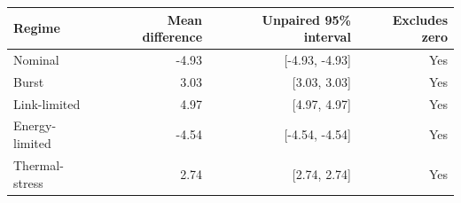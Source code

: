\begin{tabular}{lrrr}
\toprule
Regime & Mean difference & Unpaired 95\% interval & Excludes zero \\
\midrule
Nominal & -4.93 & [-4.93, -4.93] & Yes \\
Burst & 3.03 & [3.03, 3.03] & Yes \\
Link-limited & 4.97 & [4.97, 4.97] & Yes \\
Energy-limited & -4.54 & [-4.54, -4.54] & Yes \\
Thermal-stress & 2.74 & [2.74, 2.74] & Yes \\
\bottomrule
\end{tabular}